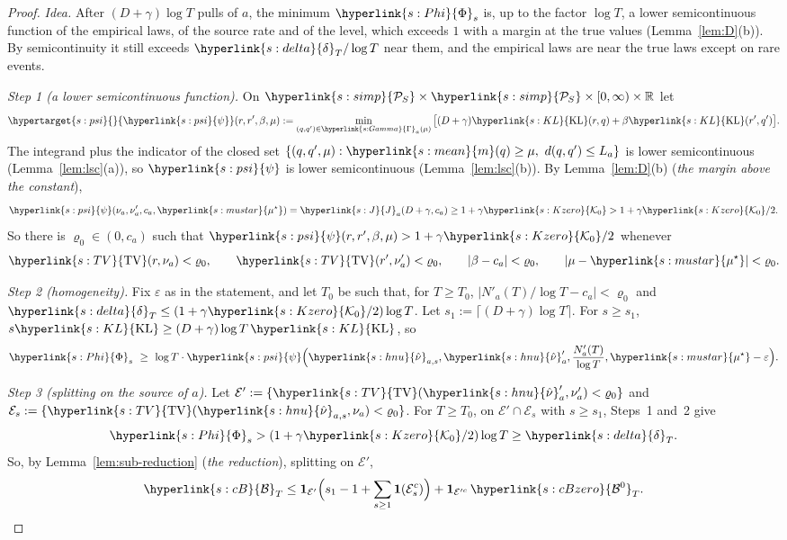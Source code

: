 \documentclass[11pt]{article}
\newcommand{\ind}{\mathbf{1}}
\newcommand{\cE}{\mathcal{E}}
\newcommand{\dt}[1]{\hypertarget{#1}{}}
\newcommand{\sy}[2]{{\hyperlink{#1}{#2}}}
\newcommand{\Simp}{\sy{s:simp}{\mathcal{P}_{S}}}
\newcommand{\mean}{\sy{s:mean}{m}}
\newcommand{\KL}{\sy{s:KL}{\mathrm{KL}}}
\newcommand{\TV}{\sy{s:TV}{\mathrm{TV}}}
\newcommand{\mus}{\sy{s:mustar}{\mu^{\star}}}
\newcommand{\hnu}{\sy{s:hnu}{\hat\nu}}
\newcommand{\Pairs}{\sy{s:Gamma}{\Gamma}}
\newcommand{\Jf}{\sy{s:J}{J}}
\newcommand{\Ko}{\sy{s:Kzero}{\mathcal{K}_{0}}}
\newcommand{\dl}{\sy{s:delta}{\delta}}
\newcommand{\cB}{\sy{s:cB}{\mathcal{B}}}
\newcommand{\cBz}{\sy{s:cBzero}{\mathcal{B}^{0}}}
\newcommand{\Ph}{\sy{s:Phi}{\Phi}}
\newcommand{\psif}{\sy{s:psi}{\psi}}
\begin{document}
\begin{proof}
\emph{Idea.} After $(D+\gamma)\log T$ pulls of $a$, the minimum $\Ph_s$ is, up to the factor
$\log T$, a lower semicontinuous function of the empirical laws, of the source rate and of the level,
which exceeds $1$ with a margin at the true values (Lemma~\ref{lem:D}(b)). By semicontinuity it still
exceeds $\dl_T/\log T$ near them, and the empirical laws are near the true laws except on rare
events.

\emph{Step 1 (a lower semicontinuous function).} On $\Simp\times\Simp\times[0,\infty)\times\mathbb R$
let
\begin{equation*}
\dt{s:psi}\psif(r,r',\beta,\mu):=\min_{(q,q')\in\Pairs_a(\mu)}\big[(D+\gamma)\KL(r,q)+\beta\KL(r',q')\big].
\end{equation*}
The integrand plus the indicator of the closed set
$\{(q,q',\mu):\mean(q)\ge\mu,\ d(q,q')\le L_a\}$ is lower semicontinuous (Lemma~\ref{lem:lsc}(a)), so
$\psif$ is lower semicontinuous (Lemma~\ref{lem:lsc}(b)). By Lemma~\ref{lem:D}(b) (\emph{the margin
above the constant}),
\begin{equation*}
\psif(\nu_a,\nu'_a,c_a,\mus)=\Jf_a(D+\gamma,c_a)\ge1+\gamma\Ko>1+\gamma\Ko/2.
\end{equation*}
So there is $\varrho_0\in(0,c_a)$ such that $\psif(r,r',\beta,\mu)>1+\gamma\Ko/2$ whenever
\begin{equation*}
\TV(r,\nu_a)<\varrho_0,\qquad\TV(r',\nu'_a)<\varrho_0,\qquad|\beta-c_a|<\varrho_0,\qquad
|\mu-\mus|<\varrho_0 .
\end{equation*}

\emph{Step 2 (homogeneity).} Fix $\varepsilon$ as in the statement, and let $T_0$ be such that, for
$T\ge T_0$, $|N'_a(T)/\log T-c_a|<\varrho_0$ and $\dl_T\le(1+\gamma\Ko/2)\log T$. Let
$s_1:=\lceil(D+\gamma)\log T\rceil$. For $s\ge s_1$, $s\KL\ge(D+\gamma)\log T\,\KL$, so
\begin{equation*}
\Ph_s\ \ge\ \log T\cdot\psif\Big(\hnu_{a,s},\hnu'_a,\frac{N'_a(T)}{\log T},\mus-\varepsilon\Big).
\end{equation*}

\emph{Step 3 (splitting on the source of $a$).} Let $\cE':=\{\TV(\hnu'_a,\nu'_a)<\varrho_0\}$ and
$\cE_s:=\{\TV(\hnu_{a,s},\nu_a)<\varrho_0\}$. For $T\ge T_0$, on $\cE'\cap\cE_s$ with $s\ge s_1$,
Steps~1 and~2 give
\begin{equation*}
\Ph_s>(1+\gamma\Ko/2)\log T\ge\dl_T .
\end{equation*}
So, by Lemma~\ref{lem:sub-reduction} (\emph{the reduction}), splitting on $\cE'$,
\begin{equation*}
\cB_T\le\ind_{\cE'}\Big(s_1-1+\sum_{s\ge1}\ind(\cE_s^c)\Big)+\ind_{\cE'^c}\,\cBz_T .
\end{equation*}


\end{proof}
\end{document}
